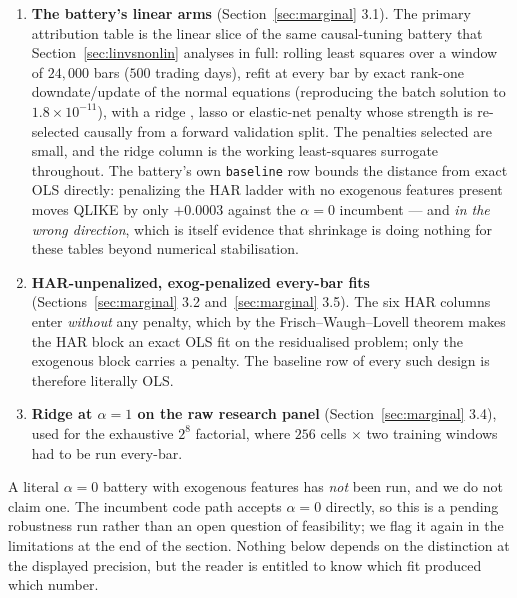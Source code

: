 \begin{enumerate}
\item \textbf{The battery's linear arms} (Section~\ref{sec:marginal} 3.1). The primary
attribution table is the linear slice of the same causal-tuning battery that
Section~\ref{sec:linvsnonlin} analyses in full: rolling least squares over a window of
$24{,}000$ bars ($500$ trading days), refit at every bar by exact rank-one
downdate/update of the normal equations (reproducing the batch solution to
$1.8 \times 10^{-11}$), with a ridge \citep{HoerlKennard1970}, lasso
\citep{Tibshirani1996} or elastic-net \citep{ZouHastie2005} penalty whose strength is
re-selected causally from a forward validation split. The penalties selected are small,
and the ridge column is the working least-squares surrogate throughout. The battery's own
\texttt{baseline} row bounds the distance from exact OLS directly: penalizing the HAR
ladder with no exogenous features present moves QLIKE by only $+0.0003$ against the
$\alpha = 0$ incumbent --- and \emph{in the wrong direction}, which is itself evidence
that shrinkage is doing nothing for these tables beyond numerical stabilisation.
\item \textbf{HAR-unpenalized, exog-penalized every-bar fits}
(Sections~\ref{sec:marginal} 3.2 and~\ref{sec:marginal} 3.5). The six HAR columns enter
\emph{without} any penalty, which by the Frisch--Waugh--Lovell theorem
\citep{FrischWaugh1933,Lovell1963} makes the HAR block an exact OLS fit on the residualised
problem; only the exogenous block carries a penalty. The baseline row of every such design
is therefore literally OLS.
\item \textbf{Ridge at $\alpha = 1$ on the raw research panel}
(Section~\ref{sec:marginal} 3.4), used for the exhaustive $2^8$ factorial, where $256$
cells $\times$ two training windows had to be run every-bar.
\end{enumerate}

\noindent A literal $\alpha = 0$ battery with exogenous features has \emph{not} been run,
and we do not claim one. The incumbent code path accepts $\alpha = 0$ directly, so this is
a pending robustness run rather than an open question of feasibility; we flag it again in
the limitations at the end of the section. Nothing below depends on the distinction at the
displayed precision, but the reader is entitled to know which fit produced which number.

